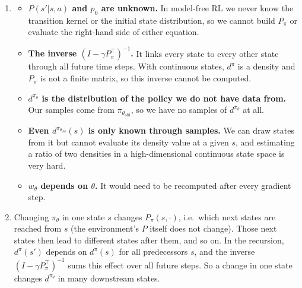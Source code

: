 \documentclass[11pt]{article}
\newcommand{\piold}{\pi_{\theta_{\mathrm{old}}}}
\begin{document}
\begin{enumerate}[label=(\alph*)]
  \item
        \begin{itemize}
          \item \textbf{$P(s'|s,a)$ and $p_0$ are unknown.} In model-free RL we never know the transition
                kernel or the initial state distribution, so we cannot build $P_\pi$ or evaluate the right-hand
                side of either equation.
          \item \textbf{The inverse $(I - \gamma P_\pi^\top)^{-1}$.} It links every state to every other
                state through all future time steps. With continuous states, $d^\pi$ is a density and $P_\pi$
                is not a finite matrix, so this inverse cannot be computed.
          \item \textbf{$d^{\pi_\theta}$ is the distribution of the policy we do not have data from.}
                Our samples come from $\piold$, so we have no samples of $d^{\pi_\theta}$ at all.
          \item \textbf{Even $d^{\piold}(s)$ is only known through samples.} We can draw states from it
                but cannot evaluate its density value at a given $s$, and estimating a ratio of two densities
                in a high-dimensional continuous state space is very hard.
          \item \textbf{$w_\theta$ depends on $\theta$.} It would need to be recomputed after every
                gradient step.
        \end{itemize}

  \item Changing $\pi_\theta$ in one state $s$ changes $P_\pi(s, \cdot)$, i.e.\ which next
        states are reached from $s$ (the environment's $P$ itself does not change). Those next states
        then lead to different states after them, and so on. In the recursion, $d^\pi(s')$ depends on
        $d^\pi(s)$ for all predecessors $s$, and the inverse $(I - \gamma P_\pi^\top)^{-1}$ sums this
        effect over all future steps. So a change in one state changes $d^{\pi_\theta}$ in many
        downstream states.


\end{enumerate}
\end{document}
